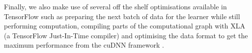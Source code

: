 Finally, we also make use of several off the shelf optimisations available in TensorFlow \cite{abadi2017tensorflow} such as preparing the next batch of data for the learner while still performing computation, compiling parts of the computational graph with XLA (a TensorFlow Just-In-Time compiler) and optimising the data format to get the maximum performance from the cuDNN framework \cite{DBLP:journals/corr/ChetlurWVCTCS14}.

